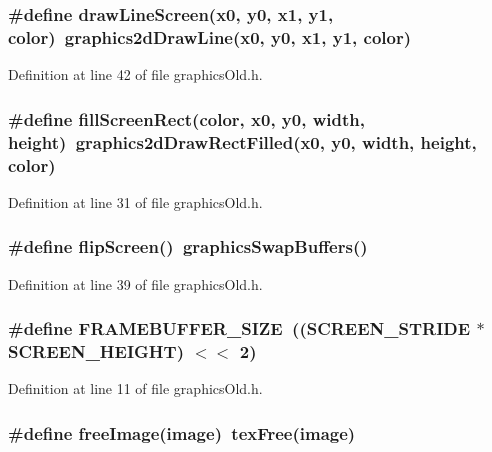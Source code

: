 \subsubsection{\setlength{\rightskip}{0pt plus 5cm}\#define draw\-Line\-Screen(x0, y0, x1, y1, color)~graphics2d\-Draw\-Line(x0, y0, x1, y1, color)}\label{graphicsOld_8h_dcf1f38106baa0c899aef7bf2a65a484}




Definition at line 42 of file graphics\-Old.h.
\subsubsection{\setlength{\rightskip}{0pt plus 5cm}\#define fill\-Screen\-Rect(color, x0, y0, width, height)~graphics2d\-Draw\-Rect\-Filled(x0, y0, width, height, color)}\label{graphicsOld_8h_82b309b0eb5bbbbcbf3727d3cbee5b7a}




Definition at line 31 of file graphics\-Old.h.
\subsubsection{\setlength{\rightskip}{0pt plus 5cm}\#define flip\-Screen()~graphics\-Swap\-Buffers()}\label{graphicsOld_8h_6c9ebf33b45ef22a2b0499423a59639a}




Definition at line 39 of file graphics\-Old.h.
\subsubsection{\setlength{\rightskip}{0pt plus 5cm}\#define FRAMEBUFFER\_\-SIZE~((SCREEN\_\-STRIDE $\ast$ SCREEN\_\-HEIGHT) $<$$<$ 2)}\label{graphicsOld_8h_8967718357443550d22f17c281a67587}




Definition at line 11 of file graphics\-Old.h.
\subsubsection{\setlength{\rightskip}{0pt plus 5cm}\#define free\-Image(image)~tex\-Free(image)}\label{graphicsOld_8h_a962222a2df29d1ec3b021e095a6b025}




